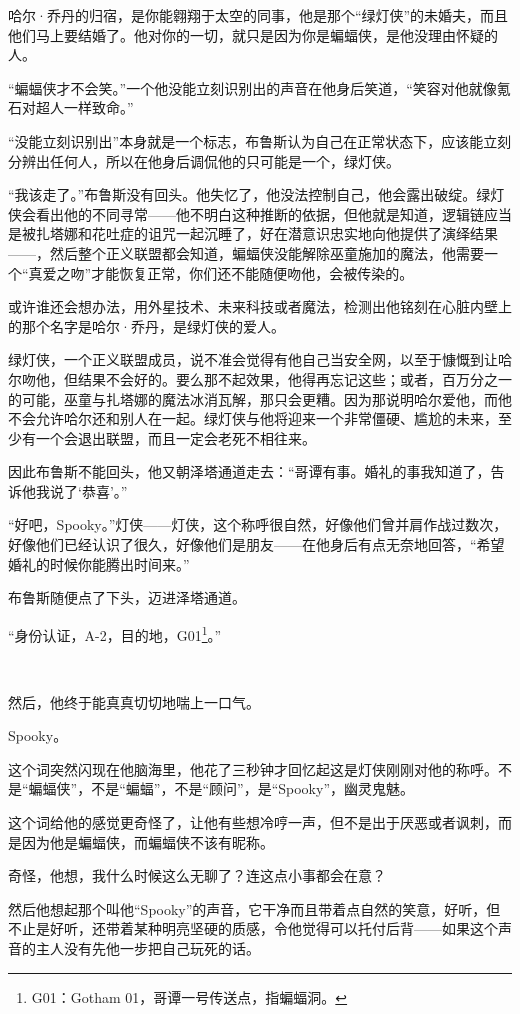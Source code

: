 \documentclass[../main.tex]{subfiles}
\begin{document}
哈尔·乔丹的归宿，是你能翱翔于太空的同事，他是那个“绿灯侠”的未婚夫，而且他们马上要结婚了。他对你的一切，就只是因为你是蝙蝠侠，是他没理由怀疑的人。

“蝙蝠侠才不会笑。”一个他没能立刻识别出的声音在他身后笑道，“笑容对他就像氪石对超人一样致命。”

“没能立刻识别出”本身就是一个标志，布鲁斯认为自己在正常状态下，应该能立刻分辨出任何人，所以在他身后调侃他的只可能是一个，绿灯侠。

“我该走了。”布鲁斯没有回头。他失忆了，他没法控制自己，他会露出破绽。绿灯侠会看出他的不同寻常——他不明白这种推断的依据，但他就是知道，逻辑链应当是被扎塔娜和花吐症的诅咒一起沉睡了，好在潜意识忠实地向他提供了演绎结果——，然后整个正义联盟都会知道，蝙蝠侠没能解除巫童施加的魔法，他需要一个“真爱之吻”才能恢复正常，你们还不能随便吻他，会被传染的。

或许谁还会想办法，用外星技术、未来科技或者魔法，检测出他铭刻在心脏内壁上的那个名字是哈尔·乔丹，是绿灯侠的爱人。

绿灯侠，一个正义联盟成员，说不准会觉得有他自己当安全网，以至于慷慨到让哈尔吻他，但结果不会好的。要么那不起效果，他得再忘记这些；或者，百万分之一的可能，巫童与扎塔娜的魔法冰消瓦解，那只会更糟。因为那说明哈尔爱他，而他不会允许哈尔还和别人在一起。绿灯侠与他将迎来一个非常僵硬、尴尬的未来，至少有一个会退出联盟，而且一定会老死不相往来。

因此布鲁斯不能回头，他又朝泽塔通道走去：“哥谭有事。婚礼的事我知道了，告诉他我说了`恭喜'。”

“好吧，Spooky。”灯侠——灯侠，这个称呼很自然，好像他们曾并肩作战过数次，好像他们已经认识了很久，好像他们是朋友——在他身后有点无奈地回答，“希望婚礼的时候你能腾出时间来。”

布鲁斯随便点了下头，迈进泽塔通道。

“身份认证，A-2，目的地，G01\footnote[1]{G01：Gotham 01，哥谭一号传送点，指蝙蝠洞。}。”

~\

然后，他终于能真真切切地喘上一口气。

Spooky。

这个词突然闪现在他脑海里，他花了三秒钟才回忆起这是灯侠刚刚对他的称呼。不是“蝙蝠侠”，不是“蝙蝠”，不是“顾问”，是“Spooky”，幽灵鬼魅。

这个词给他的感觉更奇怪了，让他有些想冷哼一声，但不是出于厌恶或者讽刺，而是因为他是蝙蝠侠，而蝙蝠侠不该有昵称。

奇怪，他想，我什么时候这么无聊了？连这点小事都会在意？

然后他想起那个叫他“Spooky”的声音，它干净而且带着点自然的笑意，好听，但不止是好听，还带着某种明亮坚硬的质感，令他觉得可以托付后背——如果这个声音的主人没有先他一步把自己玩死的话。
\end{document}
